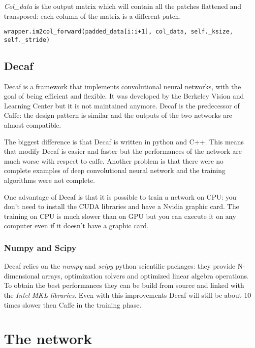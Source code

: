 \textit{Col\_data} is the output matrix which will contain all the patches flattened and transposed: each column of the matrix is a different patch.

\begin{lstlisting}[linewidth=8.0cm]
wrapper.im2col_forward(padded_data[i:i+1], col_data, self._ksize, self._stride)
\end{lstlisting}

\subsection{Decaf}

Decaf is a framework that implements convolutional neural networks, with the goal of being efficient and flexible. It was developed by the Berkeley Vision and Learning Center but it is not maintained anymore. Decaf is the predecessor of Caffe: the design pattern is similar and the outputs of the two networks are almost compatible.

The biggest difference is that Decaf is written in python and C++. This means that modify Decaf is easier and faster but the performances of the network are much worse with respect to caffe. Another problem is that there were no complete examples of deep convolutional neural network and the training algorithms were not complete.

One advantage of Decaf is that it is possible to train a network on CPU: you don't need to install the CUDA libraries and have a Nvidia graphic card. The training on CPU is much slower than on GPU but you can execute it on any computer even if it doesn't have a graphic card.

\subsubsection{Numpy and Scipy}

Decaf relies on the \textit{numpy} and \textit{scipy} python scientific packages: they provide N-dimensional arrays, optimization solvers and optimized linear algebra operations. To obtain the best performances they can be build from source and linked with the \textit{Intel MKL libraries}. Even with this improvements Decaf will still be about 10 times slower then Caffe in the training phase.

\section{The network} \label{sec:network}

